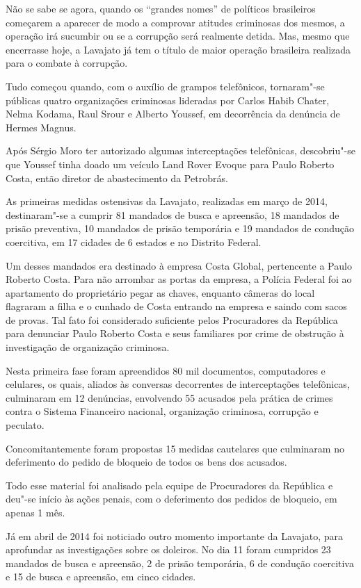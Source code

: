 Não se sabe se agora, quando os ``grandes nomes'' de políticos
brasileiros começarem a aparecer de modo a comprovar atitudes criminosas
dos mesmos, a operação irá sucumbir ou se a corrupção será realmente
detida. Mas, mesmo que encerrasse hoje, a Lavajato já tem o título de
maior operação brasileira realizada para o combate à corrupção.

Tudo começou quando, com o auxílio de grampos telefônicos, tornaram"-se
públicas quatro organizações criminosas lideradas por Carlos Habib
Chater, Nelma Kodama, Raul Srour e Alberto Youssef, em decorrência da
denúncia de Hermes Magnus.

Após Sérgio Moro ter autorizado algumas interceptações telefônicas,
descobriu"-se que Youssef tinha doado um veículo Land Rover Evoque para
Paulo Roberto Costa, então diretor de abastecimento da Petrobrás.

As primeiras medidas ostensivas da Lavajato, realizadas em março de
2014, destinaram"-se a cumprir 81 mandados de busca e apreensão, 18
mandados de prisão preventiva, 10 mandados de prisão temporária e 19
mandados de condução coercitiva, em 17 cidades de 6 estados e no
Distrito Federal.

Um desses mandados era destinado à empresa Costa Global, pertencente a
Paulo Roberto Costa. Para não arrombar as portas da empresa, a Polícia
Federal foi ao apartamento do proprietário pegar as chaves, enquanto
câmeras do local flagraram a filha e o cunhado de Costa entrando na
empresa e saindo com sacos de provas. Tal fato foi considerado
suficiente pelos Procuradores da República para denunciar Paulo Roberto
Costa e seus familiares por crime de obstrução à investigação de
organização criminosa.

Nesta primeira fase foram apreendidos 80 mil documentos, computadores e
celulares, os quais, aliados às conversas decorrentes de interceptações
telefônicas, culminaram em 12 denúncias, envolvendo 55 acusados pela
prática de crimes contra o Sistema Financeiro nacional, organização
criminosa, corrupção e peculato.

Concomitantemente foram propostas 15 medidas cautelares que culminaram
no deferimento do pedido de bloqueio de todos os bens dos acusados.

Todo esse material foi analisado pela equipe de Procuradores da
República e deu"-se início às ações penais, com o deferimento dos pedidos
de bloqueio, em apenas 1 mês.

Já em abril de 2014 foi noticiado outro momento importante da Lavajato,
para aprofundar as investigações sobre os doleiros. No dia 11 foram
cumpridos 23 mandados de busca e apreensão, 2 de prisão temporária, 6 de
condução coercitiva e 15 de busca e apreensão, em cinco cidades.

